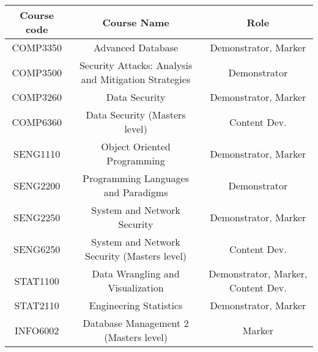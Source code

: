 \documentclass{myresume}
\begin{document}
        \begin{center}
        \begin{tabular}{ c | c | c }
                \hline
                \textbf{Course code} & \textbf{Course Name} &
                \textbf{Role} \\
                \hline
                \hline
                COMP3350 & Advanced Database & Demonstrator, Marker \\
                \hline
                COMP3500 & Security Attacks: Analysis and Mitigation Strategies & Demonstrator \\
                \hline
                COMP3260 & Data Security & Demonstrator, Marker \\
                \hline
                COMP6360 & Data Security (Masters level) & Content Dev. \\
                \hline
                SENG1110 & Object Oriented Programming & Demonstrator, Marker \\
                \hline
                SENG2200 & Programming Languages and Paradigms & Demonstrator \\
                \hline
                SENG2250 & System and Network Security & Demonstrator, Marker \\
                \hline
                SENG6250 & System and Network Security (Masters level) & Content Dev. \\
                \hline
                STAT1100 & Data Wrangling and Visualization & Demonstrator, Marker, Content Dev. \\
                \hline
                STAT2110 & Engineering Statistics & Demonstrator, Marker \\
                \hline
                INFO6002 & Database Management 2 (Masters level) & Marker \\
                \hline
        \end{tabular}
        \end{center}

\end{document}
